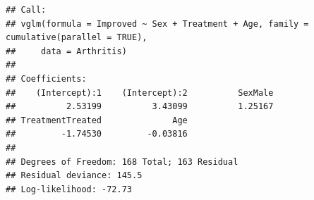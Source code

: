 \documentclass[11pt]{book}
\renewenvironment{knitrout}{\small\renewcommand{\baselinestretch}{.85}}{} %
\begin{document}
\begin{knitrout}
\color{fgcolor}\begin{kframe}
\begin{alltt}
 \hlkwb{<-}  \hlopt{~}  \hlopt{+}  \hlopt{+}  
                 \hlstd{=} \hlstd{(}\hlstd{=}\hlstd{))}
\end{alltt}
\begin{verbatim}
## Call:
## vglm(formula = Improved ~ Sex + Treatment + Age, family = cumulative(parallel = TRUE), 
##     data = Arthritis)
## 
## Coefficients:
##    (Intercept):1    (Intercept):2          SexMale 
##          2.53199          3.43099          1.25167 
## TreatmentTreated              Age 
##         -1.74530         -0.03816 
## 
## Degrees of Freedom: 168 Total; 163 Residual
## Residual deviance: 145.5 
## Log-likelihood: -72.73
\end{verbatim}
\end{kframe}
\end{knitrout}
\end{document}
